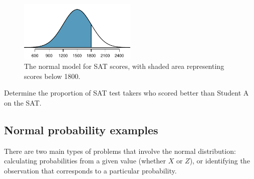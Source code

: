 \begin{figure}[h]
	\centering
	\includegraphics[width=0.5\textwidth]{ch_distributions_oi_biostat/figures/satBelow1800/satBelow1800}
	\caption{The normal model for SAT scores, with shaded area representing scores below 1800.}
	\label{satBelow1800}
\end{figure}
		
\begin{exercisewrap}
\begin{nexercise}
Determine the proportion of SAT test takers who scored better than Student A on the SAT.\footnotemark{}
\end{nexercise}
\end{exercisewrap}


\textD{\newpage}


\subsection{Normal probability examples}

There are two main types of problems that involve the normal distribution: calculating probabilities from a given value (whether $X$ or $Z$), or identifying the observation that corresponds to a particular probability. 

